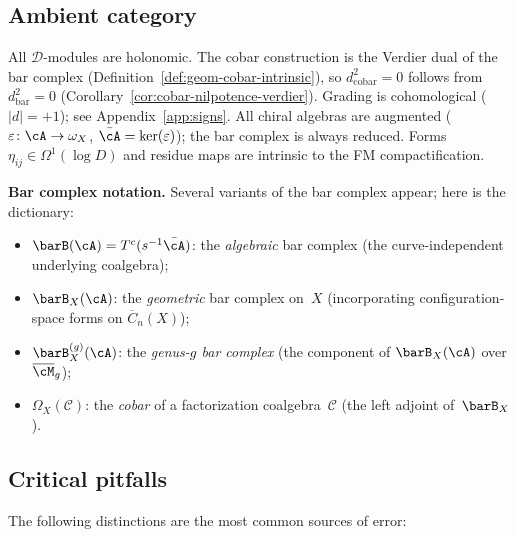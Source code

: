 \subsection{Ambient category}
\label{subsec:ambient-category}

All $\mathcal{D}$-modules are holonomic. The cobar
construction is the Verdier dual of the bar complex
(Definition~\ref{def:geom-cobar-intrinsic}), so
$d_{\mathrm{cobar}}^2 = 0$ follows from
$d_{\mathrm{bar}}^2 = 0$
(Corollary~\ref{cor:cobar-nilpotence-verdier}).
Grading is cohomological ($|d| = +1$); see
Appendix~\ref{app:signs}.
All chiral algebras are augmented
($\varepsilon\colon \cA \to \omega_X$,
$\bar{\cA} = \ker(\varepsilon)$);
the bar complex is always reduced.
Forms $\eta_{ij} \in \Omega^1(\log D)$ and residue maps
are intrinsic to the FM compactification.

\smallskip\noindent\textbf{Bar complex notation.}
Several variants of the bar complex appear; here
is the dictionary:
\begin{itemize}
\item $\barB(\cA) = T^c(s^{-1}\bar\cA)$: the
 \emph{algebraic} bar complex (the curve-independent underlying
 coalgebra);
\item $\barB_X(\cA)$: the \emph{geometric} bar complex
 on~$X$ (incorporating configuration-space forms on
 $\overline{C}_n(X)$);
\item $\barB^{(g)}_X(\cA)$: the \emph{genus-$g$ bar
 complex} (the component of $\barB_X(\cA)$ over
 $\overline{\cM}_g$);
\item $\Omega_X(\mathcal{C})$: the \emph{cobar} of a
 factorization coalgebra~$\mathcal{C}$ (the left
 adjoint of~$\barB_X$).
\end{itemize}

\subsection{Critical pitfalls}
\label{subsec:critical-pitfalls}

The following distinctions are the most common sources of error:

